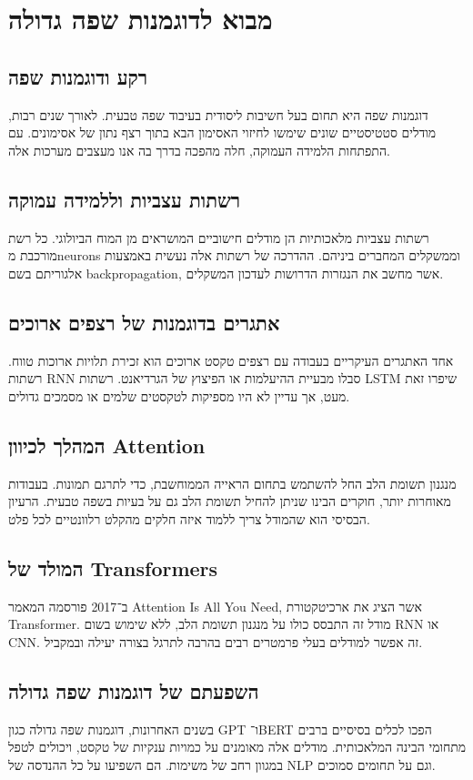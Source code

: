\chapter{מבוא לדוגמנות שפה גדולה}

\section{רקע ודוגמנות שפה}

דוגמנות שפה היא תחום בעל חשיבות ליסודית בעיבוד שפה טבעית. לאורך שנים רבות,
מודלים סטטיסטיים שונים שימשו לחיזוי האסימון הבא בתוך רצף נתון של אסימונים.
עם התפתחות הלמידה העמוקה, חלה מהפכה בדרך בה אנו מעצבים מערכות אלה.

\section{רשתות עצביות וללמידה עמוקה}

רשתות עצביות מלאכותיות הן מודלים חישוביים המושראים מן המוח הביולוגי.
כל רשת מורכבת מ\textenglish{neurons} וממשקלים המחברים ביניהם.
ההדרכה של רשתות אלה נעשית באמצעות אלגוריתם בשם \textenglish{backpropagation},
אשר מחשב את הנגזרות הדרושות לעדכון המשקלים.

\section{אתגרים בדוגמנות של רצפים ארוכים}

אחד האתגרים העיקריים בעבודה עם רצפים טקסט ארוכים הוא זכירת תלויות ארוכות טווח.
רשתות \textenglish{RNN} סבלו מבעיית ההיעלמות או הפיצוץ של הגרדיאנט.
רשתות \textenglish{LSTM} שיפרו זאת מעט, אך עדיין לא היו מספיקות לטקסטים שלמים או מסמכים גדולים.

\section{המהלך לכיוון Attention}

מנגנון תשומת הלב החל להשתמש בתחום הראייה הממוחשבת, כדי לתרגם תמונות.
בעבודות מאוחרות יותר, חוקרים הבינו שניתן להחיל תשומת הלב גם על בעיות בשפה טבעית.
הרעיון הבסיסי הוא שהמודל צריך ללמוד איזה חלקים מהקלט רלוונטיים לכל פלט.

\section{המולד של \textenglish{Transformers}}

ב־2017 פורסמה המאמר \textenglish{Attention Is All You Need},
אשר הציג את ארכיטקטורת \textenglish{Transformer}.
מודל זה התבסס כולו על מנגנון תשומת הלב, ללא שימוש בשום \textenglish{RNN} או \textenglish{CNN}.
זה אפשר למודלים בעלי פרמטרים רבים בהרבה לתרגל בצורה יעילה ובמקביל.

\section{השפעתם של דוגמנות שפה גדולה}

בשנים האחרונות, דוגמנות שפה גדולה כגון \textenglish{GPT} ו־\textenglish{BERT}
הפכו לכלים בסיסיים ברבים מתחומי הבינה המלאכותית.
מודלים אלה מאומנים על כמויות ענקיות של טקסט, ויכולים לטפל במגוון רחב של משימות.
הם השפיעו על כל ההנדסה של \textenglish{NLP} וגם על תחומים סמוכים.
